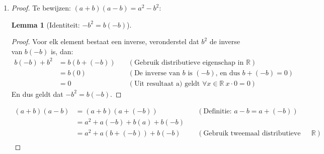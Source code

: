 \documentclass{article}
\newtheorem{lemma}{Lemma}
\newcommand{\tx}[1]{\text{#1}}
\newcommand{\R}{\mathbb{R}}
\newcommand{\zdd}{\tx{ zodanig dat }}
\begin{document}
\begin{enumerate}[label=\alph*)]
\begin{proof}
    Bewijs uit het ongerijmde waarbij we
    stellen dat $a \neq 0$ en $b \neq 0$ dan $a \cdot b = 0$:
    \begin{align*}
        ab &= 0 \\
        a^{-1}ab &= a^{-1}0 &\quad (\tx{Vermenigvuldig beide kanten met $a^{-1}$}) \\
        (a^{-1}a)b &= 0  &\quad (\tx{Uit resultaat a) geldt }\forall x \in \R \ x\cdot 0 = 0) \\ 
        (1)b &= 0 &\quad (\forall x \in R \ \exists x^{-1} \in R \zdd x\cdot x^{-1} = 1)\\
        b^{-1}b &= b^{-1}0 &\quad (\tx{Vermenigvuldig beide kanten met $b^{-1}$}) \\
        (b^{-1}b) &= 0 &\quad (\tx{Uit resultaat a) geldt }\forall x \in \R \ x\cdot 0 = 0) \\ 
        1 &= 0 &\quad (\forall x \in R \ \exists x^{-1} \in R \zdd x\cdot x^{-1} = 1)
    \end{align*}
    Tegenspraak want $1 \neq 0$, en hieruit volgt als $a \neq 0$ en $b \neq 0$ dan $a\cdot b \neq 0$.
    \end{proof}
    \item
    \begin{proof}
        Te bewijzen: $(a + b)(a - b) = a^2 - b^2$:
        \begin{lemma}[Identiteit: $-b^2 = b(-b)$]
        \end{lemma}
        \begin{proof}
            Voor elk element bestaat een inverse, veronderstel dat $b^2$ de inverse van $b(-b)$ is, dan:
            \begin{align*}
                b(-b) + b^2 &= b(b + (-b)) &\quad (\tx{Gebruik distributieve eigenschap in } \R) \\
                &= b(0) &\quad (\tx{De inverse van $b$ is $(-b)$, en dus $b + (-b) = 0$}) \\
                &= 0 &\quad (\tx{Uit resultaat a) geldt }\forall x \in \R \ x\cdot 0 = 0) 
            \end{align*}
            En dus geldt dat $-b^2 = b(-b)$.
        \end{proof}
        \begin{align*}
            (a + b)(a-b) &= (a + b)(a+(-b)) &\quad (\tx{Definitie: $a-b = a + (-b)$})\\
            &= a^2 + a(-b) + b(a) + b(-b)  \\
            &= a^2 + a(b + (-b)) + b(-b) &\quad (\tx{Gebruik tweemaal distributieve eigenschap in } \R)\\

\end{align*}
\end{proof}
\end{enumerate}
\end{document}
